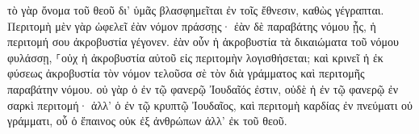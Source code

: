 \documentclass{openreader}
\begin{document}
τὸ γὰρ ὄνομα τοῦ θεοῦ δι’ ὑμᾶς βλασφημεῖται ἐν τοῖς ἔθνεσιν, καθὼς γέγραπται. 
Περιτομὴ μὲν γὰρ ὠφελεῖ ἐὰν νόμον πράσσῃς· ἐὰν δὲ παραβάτης νόμου ᾖς, ἡ περιτομή σου ἀκροβυστία γέγονεν. 
ἐὰν οὖν ἡ ἀκροβυστία τὰ δικαιώματα τοῦ νόμου φυλάσσῃ, ⸀οὐχ ἡ ἀκροβυστία αὐτοῦ εἰς περιτομὴν λογισθήσεται; 
καὶ κρινεῖ ἡ ἐκ φύσεως ἀκροβυστία τὸν νόμον τελοῦσα σὲ τὸν διὰ γράμματος καὶ περιτομῆς παραβάτην νόμου. 
οὐ γὰρ ὁ ἐν τῷ φανερῷ Ἰουδαῖός ἐστιν, οὐδὲ ἡ ἐν τῷ φανερῷ ἐν σαρκὶ περιτομή· 
ἀλλ’ ὁ ἐν τῷ κρυπτῷ Ἰουδαῖος, καὶ περιτομὴ καρδίας ἐν πνεύματι οὐ γράμματι, οὗ ὁ ἔπαινος οὐκ ἐξ ἀνθρώπων ἀλλ’ ἐκ τοῦ θεοῦ. 
\end{document}
